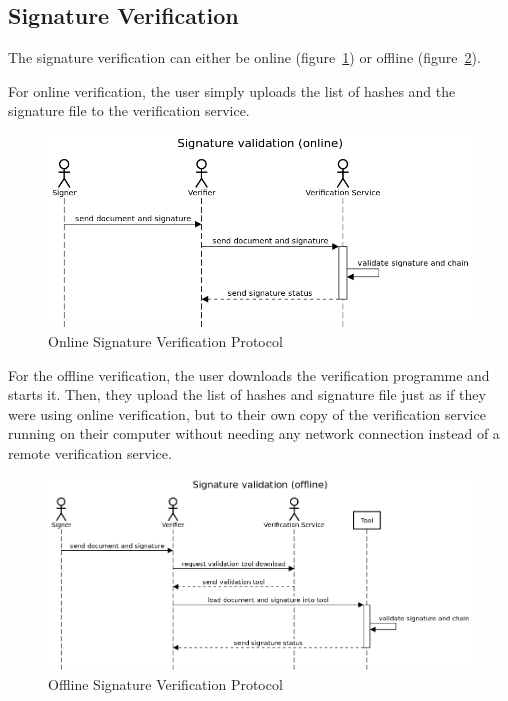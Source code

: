 \subsection{Signature Verification}\label{subsec:signature-verification}

The signature verification can either be online (figure~\ref{fig:onlinesignatureverificationprotocol})
or offline (figure~\ref{fig:offlinesignatureverificationprotocol}).

For online verification, the user simply uploads the list of hashes and the signature file to the verification service.

\begin{figure}
	\begin{center}
		\includegraphics[scale=0.5]{images/protocol_online_verification_high_level.png}
		\caption{Online Signature Verification Protocol}
		\label{fig:onlinesignatureverificationprotocol}
	\end{center}
\end{figure}

For the offline verification, the user downloads the verification programme and starts it.
Then, they upload the list of hashes and signature file just as if they were using online verification,
but to their own copy of the verification service running on their computer without needing any network connection
instead of a remote verification service.

\begin{figure}
	\begin{center}
		\includegraphics[scale=0.5]{images/protocol_offline_verification_high_level.png}
		\caption{Offline Signature Verification Protocol}
		\label{fig:offlinesignatureverificationprotocol}
	\end{center}
\end{figure}

